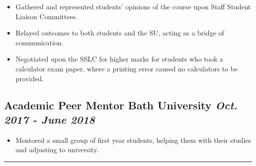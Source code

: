 \documentclass[11pt,a4paper]{report}
\begin{document}
		\begin{itemize}
			\item Gathered and represented students' opinions of the course upon Staff Student Liaison Committees.
			\item Relayed outcomes to both students and the SU, acting as a bridge of communication.
			\item Negotiated upon the SSLC for higher marks for students who took a calculator exam paper, where a printing error caused no calculators to be provided.
		\end{itemize}

	\subsection*{
			Academic Peer Mentor
			\hspace{0.8in}\hfill\normalfont Bath University 
			\hfill\normalfont\emph{ Oct. 2017 - June 2018 }
		}

		\begin{itemize}
			\item Mentored a small group of first year students, helping them with their studies and adjusting to university.
		\end{itemize}

\hrule\vspace{0.175in}
\end{document}
